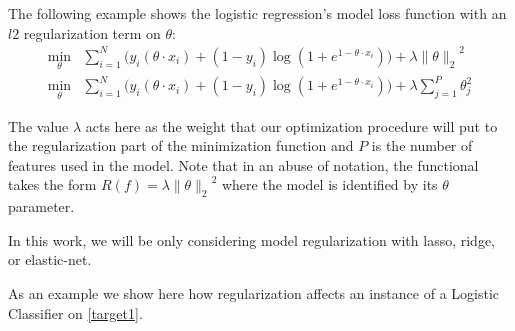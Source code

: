 The following example shows the logistic regression's model loss function with an $l2$ regularization term on $\theta$:
\begin{equation}
\begin{split}
\min_{\theta} & \sum_{i=1}^N \big(y_i ( \theta \cdot x_i ) + (1- y_i)\log(1 + e^{1- \theta \cdot x_i} ) \big) + \lambda { \| \theta \|_{2}}^2 \\
\min_{\theta} & \sum_{i=1}^N \big(y_i ( \theta \cdot x_i ) + (1- y_i)\log(1 + e^{1- \theta \cdot x_i} ) \big) + \lambda \sum_{j=1}^P \theta_j^2
\end{split}
\label{eq:logitRegularization}
\end{equation}




The value $\lambda$ acts here as the weight that our optimization procedure will put to the regularization part of the minimization function and $P$ is the number of features used in the model.
Note that in an abuse of notation, the functional takes the form $R(f) = \lambda { \| \theta \|_{2}}^2$ where the model is identified by its $\theta$ parameter.

In this work, we will be only considering model regularization with lasso, ridge, or elastic-net.

As an example we show here how regularization affects an instance of a Logistic Classifier on \cref{target1}.


